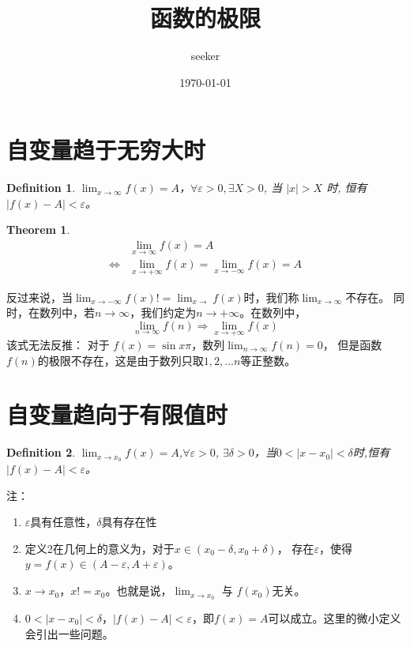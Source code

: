 \documentclass[UTF8]{ctexart}
\title{函数的极限}
\author{seeker}
\date{\today}
\newtheorem{definition}{Definition}
\newtheorem{theorem}{Theorem}
\begin{document}
	\maketitle
	\section{自变量趋于无穷大时}
	\begin{definition}
		$\lim _{x \rightarrow \infty} f(x)=A$，$\forall \varepsilon>0, \exists X>0$, 当 $|x|>X$ 时, 恒有 $|f(x)-A|<\varepsilon$。
	\end{definition}

	\begin{theorem}
		\begin{equation}
			\begin{split}
				&\lim _{x\rightarrow \infty}f(x)=A \\
				\Leftrightarrow 
				&\lim _{x\rightarrow + \infty}f(x)
				=\lim _{x\rightarrow - \infty}f(x)=A
			\end{split}
		\end{equation}
	\end{theorem}


	反过来说，当$\lim _{x \rightarrow -\infty}f(x)!=\lim _{x \rightarrow}f(x)$时，我们称$\lim_{x \rightarrow \infty}$不存在。
	同时，在数列中，若$n\rightarrow \infty$，我们约定为$n\rightarrow +\infty$。在数列中，
	$$\lim _{n\rightarrow \infty}f(n) \Rightarrow \lim _{x\rightarrow +\infty}f(x)$$
	该式无法反推：
	对于 $f(x)=\sin{x\pi}$，数列$\lim _{n\rightarrow\infty}f(n)=0$，
	但是函数$f(n)$的极限不存在，这是由于数列只取$1,2,...n$等正整数。
	
	\section{自变量趋向于有限值时}
	\begin{definition}
		$\lim _{x\rightarrow x_0}f(x)=A$,$\forall \varepsilon > 0$,
		$\exists \delta > 0$，当$0<|x-x_0|<\delta$时,恒有$|f(x)-A|<\varepsilon$。
	\end{definition}
	
	注：
	\begin{enumerate}
		\item $\varepsilon$具有任意性，$\delta$具有存在性
		\item 定义2在几何上的意义为，对于$x \in (x_0-\delta,x_0+\delta)$，
		存在$\varepsilon$，使得$y=f(x)\in (A-\varepsilon,A+\varepsilon)$。
		\item $x\rightarrow x_0$，$x!=x_0$。也就是说，$\lim _{x\rightarrow x_0}$ 与 $f(x_0)$无关。
		\item $0<|x-x_0|<\delta$，$|f(x)-A|<\varepsilon$，即$f(x)=A$可以成立。这里的微小定义会引出一些问题。
		
	\end{enumerate}
\end{document}
